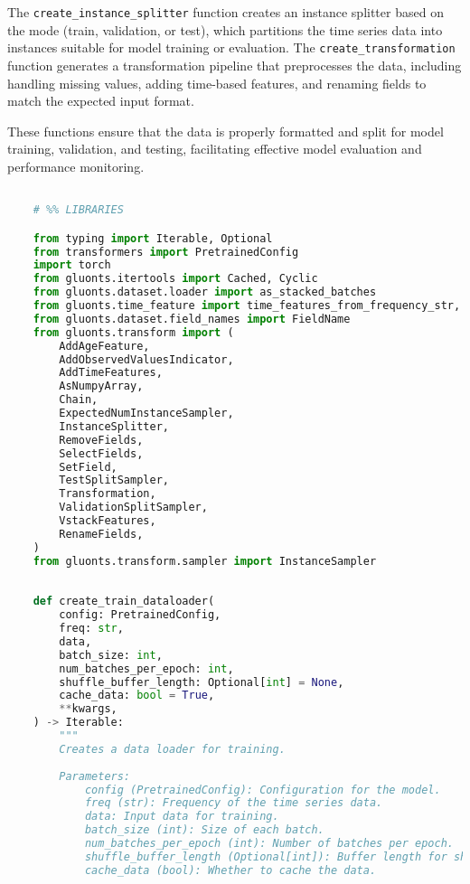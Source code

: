 The \texttt{create\_instance\_splitter} function creates an instance splitter based on the mode (train, validation, or test), which partitions the time series data into instances suitable for model training or evaluation. The \texttt{create\_transformation} function generates a transformation pipeline that preprocesses the data, including handling missing values, adding time-based features, and renaming fields to match the expected input format.

These functions ensure that the data is properly formatted and split for model training, validation, and testing, facilitating effective model evaluation and performance monitoring.

\begin{lstlisting}[language=Python, caption={Code for creating data loaders for efficient training and evaluation}, breaklines=true, label=code4]

    # %% LIBRARIES

    from typing import Iterable, Optional
    from transformers import PretrainedConfig
    import torch
    from gluonts.itertools import Cached, Cyclic
    from gluonts.dataset.loader import as_stacked_batches
    from gluonts.time_feature import time_features_from_frequency_str, TimeFeature, get_lags_for_frequency
    from gluonts.dataset.field_names import FieldName
    from gluonts.transform import (
        AddAgeFeature,
        AddObservedValuesIndicator,
        AddTimeFeatures,
        AsNumpyArray,
        Chain,
        ExpectedNumInstanceSampler,
        InstanceSplitter,
        RemoveFields,
        SelectFields,
        SetField,
        TestSplitSampler,
        Transformation,
        ValidationSplitSampler,
        VstackFeatures,
        RenameFields,
    )
    from gluonts.transform.sampler import InstanceSampler
    
    
    def create_train_dataloader(
        config: PretrainedConfig,
        freq: str,
        data,
        batch_size: int,
        num_batches_per_epoch: int,
        shuffle_buffer_length: Optional[int] = None,
        cache_data: bool = True,
        **kwargs,
    ) -> Iterable:
        """
        Creates a data loader for training.
    
        Parameters:
            config (PretrainedConfig): Configuration for the model.
            freq (str): Frequency of the time series data.
            data: Input data for training.
            batch_size (int): Size of each batch.
            num_batches_per_epoch (int): Number of batches per epoch.
            shuffle_buffer_length (Optional[int]): Buffer length for shuffling the data.
            cache_data (bool): Whether to cache the data.
    

\end{lstlisting}
